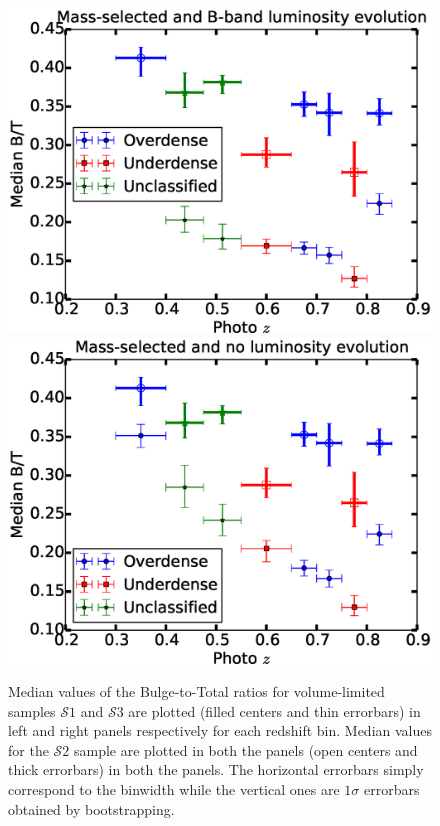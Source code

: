 \documentclass[twocolumn,useAMS,usenatbib]{mn2e}
\newcommand{\btt}{Bulge-to-Total }
\newcommand{\s}{\ensuremath{\mathcal{S}}}
\begin{document}
\begin{figure}
 \includegraphics[width=1.1\columnwidth]{median_dvcbtt1}
 \includegraphics[width=1.1\columnwidth]{median_dvcbtt2}
  \caption{Median values of the \btt ratios for volume-limited samples \s$1$ and \s$3$ are plotted (filled centers and thin errorbars) in left and right panels respectively for each redshift bin.
          Median values for the \s$2$ sample are plotted in both the panels (open centers and thick errorbars) in both the panels.
          The horizontal errorbars simply correspond to the binwidth while the vertical ones are $1\sigma$ errorbars obtained by bootstrapping.}
 \label{fig:median_dvcbtt}
\end{figure}
\end{document}
